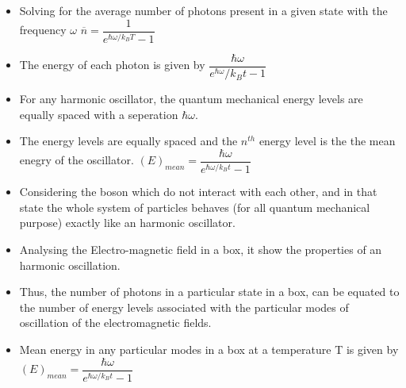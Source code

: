 \documentclass[aspectratio=169]{beamer}
\begin{document}
\begin{frame}
	\begin{itemize}
		\item Solving for the average number of photons present in a given state with the frequency $\omega$ \pause \newline
		$\overline{n} = \dfrac{1}{e^{\hbar\omega/k_{B}T} - 1}$ \pause \newline
		\item The energy of each photon is given by $\dfrac{\hbar\omega}{e^{\hbar\omega}/{k_{B}t} - 1}$ \pause \newline
		\item For any harmonic oscillator, the quantum mechanical energy levels are equally spaced with a seperation $\hbar\omega$.
	\end{itemize}
\end{frame}

\begin{frame}
	\begin{itemize}
		\item The energy levels are equally spaced and the $n^{th}$ energy level is the the mean enegry of the oscillator. \pause \newline 
		\center $(E)_{mean} = \dfrac{\hbar\omega}{e^{\hbar\omega/k_{B}t} - 1}$ \pause \newline
		\item Considering the boson which do not interact with each other, and in that state the whole system of particles behaves (for all quantum mechanical purpose) exactly like an harmonic oscillator. 
	\end{itemize}
\end{frame}

\begin{frame}
	\begin{itemize}
		\item Analysing the Electro-magnetic field in a box, it show the properties of an harmonic oscillation.
		\item Thus, the number of photons in a particular state in a box, can be equated to the number of energy levels associated with the particular modes of oscillation of the electromagnetic fields. 
	\end{itemize}
\end{frame}

\begin{frame}
	\begin{itemize}
		\item Mean energy in any particular modes in a box at a temperature T is given by  \pause \newline
		\center $(E)_{mean} = \dfrac{\hbar\omega}{e^{\hbar\omega/k_{B}t} - 1}$\pause \newline
	\end{itemize}
\end{frame} 
\end{document}
